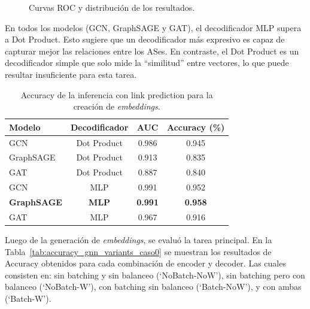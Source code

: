 \begin{figure}[H]
    \caption{Curvas ROC y distribución de los resultados.}
    \label{fig:partes_caso_0_comparacion_roc_auc}
\end{figure}

En todos los modelos (GCN, GraphSAGE y GAT), el decodificador MLP supera a Dot Product. Esto sugiere que un decodificador más expresivo es capaz de capturar mejor las relaciones entre los ASes. En contraste, el Dot Product es un decodificador simple que solo mide la “similitud” entre vectores, lo que puede resultar insuficiente para esta tarea.



\begin{table}[H]
    \centering
    \begin{tabular}{lccc}
    \hline
    \textbf{Modelo} & \textbf{Decodificador} & \textbf{AUC}& \textbf{Accuracy (\%)} \\
    \hline
    GCN & Dot Product &  0.986 & 0.945 \\
    GraphSAGE & Dot Product & 0.913 &  0.835\\
    GAT & Dot Product & 0.887 & 0.840 \\
    GCN & MLP  & 0.991 & 0.952 \\
    \textbf{GraphSAGE} & \textbf{MLP}  & \textbf{0.991} & \textbf{0.958} \\
    GAT & MLP &  0.967 & 0.916 \\
    \hline
    \end{tabular}
    \caption{Accuracy de la inferencia con link prediction para la creación de \textit{embeddings}.}
    \label{tab:comparacion_accuracy_caso0}
\end{table}

\newpage
Luego de la generación de \textit{embeddings}, se evaluó la tarea principal. En la Tabla~\ref{tab:accuracy_gnn_variants_caso0} se muestran los resultados de Accuracy obtenidos para cada combinación de encoder y decoder. Las cuales consisten en: sin batching y sin balanceo (`NoBatch-NoW'), sin batching pero con balanceo (`NoBatch-W'), con batching sin balanceo (`Batch-NoW'), y con ambas (`Batch-W').  \\


